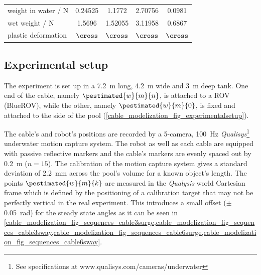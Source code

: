 \begin{table}
\begin{tabular}{@{}l|SSSS@{}}
		weight in water / \unit{\N} & 0.24525                                       & 1.1772                                           & 2.70756                                         & 0.0981                                         \\
		wet weight / \unit{\N}      & 1.5696                                        & 1.52055                                          & 3.11958                                         & 0.6867                                         \\
		plastic deformation         & {$\cross$}                                    & {$\cross$}                                       & {$\cross$}                                      & {$\cross$}                                     \\ \bottomrule
	\end{tabular}
	\label{cable_modelization_tab_cables_characteristics}
\end{table}

\subsection{Experimental setup}

The experiment is set up in a \qty{7.2}{\m} long, \qty{4.2}{\m} wide and \qty{3}{\m} deep tank. One
end of the cable, namely $\pestimated{w}{m}{n}$, is attached to a ROV (BlueROV), while the other,
namely $\pestimated{w}{m}{0}$, is fixed and attached to the side of the pool
(\cref{cable_modelization_fig_experimentalsetup}).

The cable's and robot's positions are recorded by a 5-camera, \qty{100}{\Hz}
\emph{Qualisys}\footnote{See specifications at www.qualisys.com/cameras/underwater} underwater
motion capture system. The robot as well as each cable are equipped with passive reflective markers
and the cable's markers are evenly spaced out by \qty{0.2}{\m} ($n=15$). The calibration of the
motion capture system gives a standard deviation of \qty{2.2}{\mm} across the pool's volume for a
known object's length. The points $\pestimated{w}{m}{k}$ are measured in the \textit{Qualysis}
world Cartesian frame which is defined by the positioning of a calibration target that may not be
perfectly vertical in the real experiment. This introduces a small offset
($\pm$\qty{0.05}{\radian}) for the steady state angles as it can be seen in
\cref{cable_modelization_fig_sequences_cable3surge,cable_modelization_fig_sequences_cable3sway,cable_modelization_fig_sequences_cable6surge,cable_modelization_fig_sequences_cable6sway}.

